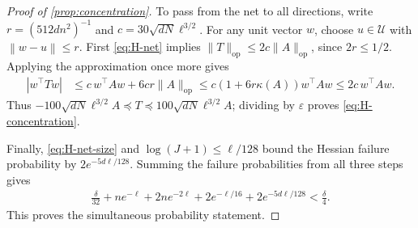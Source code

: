 \documentclass[11pt]{article}
\newcommand{\op}{\mathrm{op}}
\newcommand{\1}{\mathbf 1}
\newcommand{\eps}{\varepsilon}
\newcommand{\norm}[1]{\left\lVert #1\right\rVert}
\begin{document}
\begin{proof}[Proof of \cref{prop:concentration}]
    To pass from the net to all directions, write
    $r=(512dn^2)^{-1}$ and $c=30\sqrt{dN}\ell^{3/2}$.
    For any unit vector $w$, choose $u\in\mathcal U$ with
    $\norm{w-u}\leq r$. First \eqref{eq:H-net} implies
    $\|T\|_{\op}\leq2c\|A\|_{\op}$, since $2r\leq1/2$.
    Applying the approximation once more gives
    \begin{align}
        |w^\top Tw|
         & \leq c\,w^\top Aw+6cr\|A\|_{\op}
        \leq c(1+6r\kappa(A))w^\top Aw
        \leq2c\,w^\top Aw.
    \end{align}
    Thus $-100\sqrt{dN}\ell^{3/2}A\preceq T
        \preceq100\sqrt{dN}\ell^{3/2}A$; dividing by $\eps$ proves
    \eqref{eq:H-concentration}.

    Finally, \eqref{eq:H-net-size} and $\log(J+1)\leq\ell/128$ bound
    the Hessian failure probability by $2e^{-5d\ell/128}$.
    Summing the failure probabilities from all three steps gives
    \begin{align}
        \frac\delta{32}+ne^{-\ell}+2ne^{-2\ell}
        +2e^{-\ell/16}+2e^{-5d\ell/128}
        <\frac\delta4.
    \end{align}
    This proves the simultaneous probability statement.
\end{proof}
\end{document}
